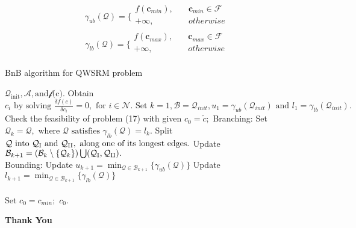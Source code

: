 \documentclass[usenames,dvipsnames]{beamer}
\begin{document}
\begin{frame}{\phantom{Tp}}
  \begin{exampleblock}{\phantom{Tp}}
   \[
     \gamma_{ub}(\mathcal{Q}) = \Bigg\{\begin{array}{ll}f(\mathbf{c}_{min}),\quad &\mathbf{c}_{min}\in\mathcal{F}\\+\infty,\quad &otherwise\\\end{array}	
    \]
    \[
     \gamma_{lb}(\mathcal{Q}) = \Bigg\{\begin{array}{ll}f(\mathbf{c}_{max}),\quad &\mathbf{c}_{max}\in\mathcal{F}\\+\infty,\quad &otherwise\\\end{array}	
     \]
  \end{exampleblock}
\end{frame}

\begin{frame}[fragile]
  \footnotesize
    \begin{block}{BnB algorithm for QWSRM problem}
        \begin{algorithmic}

	  \Input $\mathcal{Q}_{\text{init}}, \mathcal{A}, \text{and} \mathcal{f} \text{(c)}.$
	  \Initialize Obtain $c_{i} \text{ by solving } \frac{\delta f(c)}{\delta c_{i}}=0, \text{ for } i\in\mathcal{N}.\text{ Set } k = 1, \mathcal{B} = \mathcal{Q}_{init},u_{1}=\gamma_{ub}(\mathcal{Q}_{init}) \text{ and } l_{1} = \gamma_{lb}(\mathcal{Q}_{init}).$\\
	  Check the feasibility of problem (17) with given
	  \State $c_{0} = \widetilde{c};$
	  \Else
	  \State Branching:
\State\quad{} Set $\mathcal{Q}_{k} = \mathcal{Q}, \text{ where } \mathcal{Q} \text{ satisfies } \gamma_{lb}(\mathcal{Q}) = l_{k}.$
	  \State\quad{} Split $\mathcal{Q} \text{ into } \mathcal{Q}_{\rm{I}} \text{ and } \mathcal{Q}_{\rm{II}}, \text{ along one of its longest edges.}$
	     \State\quad{} Update $\mathcal{B}_{k+1} = (\mathcal{B}_{k}\setminus{\{\mathcal{Q}_{k}\}})\bigcup(\mathcal{Q}_{\rm{I}}, \mathcal{Q}_{\rm{II}}).$\\
	  \State Bounding:
	    \State\quad{} Update $u_{k+1} = \min_{\mathcal{Q}\in\mathcal{B}_{k+1}}{\{\gamma_{ub}(\mathcal{Q})}\}$
\State\quad{} Update $l_{k+1} = \min_{\mathcal{Q}\in\mathcal{B}_{k+1}}{\{\gamma_{lb}(\mathcal{Q})}\}$\\
	  \EndWhile\\
	  Set $c_{0} = c_{min};$
	  \EndIf
	  \Output $c_{0}.$
        \end{algorithmic}
    \end{block}
\end{frame}
\begin{frame}
  \color{Sepia}
  \centering \Huge\textbf{Thank You}
\end{frame}
\end{document}
